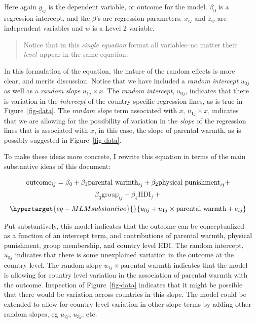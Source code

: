 \documentclass[
  letterpaper,
  DIV=11,
  numbers=noendperiod]{scrreprt}
\begin{document}
Here again \(y_{ij}\) is the dependent variable, or outcome for the
model. \(\beta_0\) is a regression intercept, and the \(\beta\)'s are
regression parameters. \(x_{ij}\) and \(z_{ij}\) are independent
variables and \(w\) is a Level 2 variable.

\begin{quote}
Notice that in this \emph{single equation} format all variables--no
matter their \emph{level}--appear in the same equation.
\end{quote}

In this formulation of the equation, the nature of the random effects is
more clear, and merits discussion. Notice that we have included a
\emph{random intercept} \(u_{0j}\) as well as a \emph{random slope}
\(u_{1j} \times x\). The \emph{random intercept}, \(u_{0j}\), indicates
that there is variation in the \emph{intercept} of the country specific
regression lines, as is true in Figure~\ref{fig-data}. The \emph{random
slope} term associated with \(x\), \(u_{1j} \times x\), indicates that
we are allowing for the possibility of variation in the \emph{slope} of
the regression lines that is associated with \(x\), in this case, the
slope of parental warmth, as is possibly suggested in
Figure~\ref{fig-data}.

To make these ideas more concrete, I rewrite this equation in terms of
the main substantive ideas of this document:

\[\text{outcome}_{ij} = \beta_0 + \beta_1 \text{parental warmth}_{ij} + \\ \beta_2 \text{physical punishment}_{ij} +\]
\[\beta_3 \text{group}_{ij} + \beta_4 \text{HDI}_{j} + \]
\begin{equation}\protect\hypertarget{eq-MLMsubstantive}{}{u_{0j} + u_{1j} \times \text{parental warmth} + e_{ij}}\label{eq-MLMsubstantive}\end{equation}

Put substantively, this model indicates that the outcome can be
conceptualized as a function of an intercept term, and contributions of
parental warmth, physical punishment, group membership, and country
level HDI. The random intercept, \(u_{0j}\) indicates that there is some
unexplained variation in the outcome at the country level. The random
slope \(u_{1j} \times \text{parental warmth}\) indicates that the model
is allowing for country level variation in the association of parental
warmth with the outcome. Inspection of Figure~\ref{fig-data} indicates
that it might be possible that there would be variation across countries
in this slope. The model could be extended to allow for country level
variation in other slope terms by adding other random slopes, eg
\(u_{2j}\), \(u_{3j}\), etc.
\end{document}
